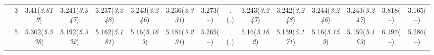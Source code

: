 \documentclass{article}
\begin{document}
\begin{table}[tbp]
{\begin{tabularx}{\textwidth}{lCCCCCCCCCCCCCC}
&3&3.41\newline (\emph{3.619})&3.241\newline (\emph{3.347})&3.237\newline (\emph{3.248})&3.243\newline (\emph{3.246})&3.236\newline (\emph{3.331})&3.273\newline (--)&.\newline (\emph{.})&3.243\newline (\emph{3.247})&3.242\newline (\emph{3.248})&3.244\newline (\emph{3.246})&3.243\newline (\emph{3.247})&3.818\newline (--)&3.165\newline (--) \tabularnewline
&5&5.302\newline (\emph{5.538})&5.192\newline (\emph{5.332})&5.162\newline (\emph{5.181})&5.16\newline (\emph{5.163})&5.181\newline (\emph{5.291})&5.265\newline (--)&.\newline (\emph{.})&5.16\newline (\emph{5.162})&5.159\newline (\emph{5.171})&5.16\newline (\emph{5.159})&5.159\newline (\emph{5.163})&6.197\newline (--)&5.286\newline (--) \tabularnewline
\bottomrule \addlinespace[1.5ex]

\end{tabularx}
}
\end{table}
\end{document}
